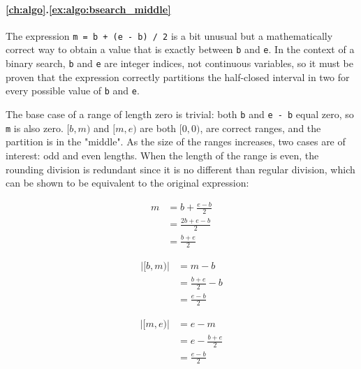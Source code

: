 \paragraph{\ref{ch:algo}.\ref{ex:algo:bsearch_middle}}

The expression \texttt{m = b + (e - b) / 2} is a bit unusual but a
mathematically correct way to obtain a value that is exactly between \texttt{b}
and \texttt{e}.  In the context of a binary search, \texttt{b} and \texttt{e}
are integer indices, not continuous variables, so it must be proven that the
expression correctly partitions the half-closed interval in two for every
possible value of \texttt{b} and \texttt{e}.

The base case of a range of length zero is trivial: both \texttt{b} and
\texttt{e - b} equal zero, so \texttt{m} is also zero\footnotemark.  $[b, m)$
and $[m, e)$ are both $[0, 0)$, are correct ranges, and the partition is in the
"middle".  As the size of the ranges increases, two cases are of interest: odd
and even lengths.  When the length of the range is even, the rounding division
is redundant since it is no different than regular division, which can be shown
to be equivalent to the original expression:

\footnotetext{
    Recall that, as mentioned in section \secref{subsec:algo:ranges}, the length
    calculation for half-open ranges is very simple: $|[b, e)| = e - b$.}

\begin{multicols}{3}
    \begin{align*}
        m &= b + \frac{e - b}{2} \\
          &= \frac{2b + e - b}{2} \\
          &= \frac{b + e}{2} \\
    \end{align*}
    \columnbreak
    \begin{align*} \\
        |[b, m)| &= m - b \phantom{\frac{1}{1}} \\
                 &= \frac{b + e}{2} - b \\
                 &= \frac{e - b}{2} \\
    \end{align*}
    \columnbreak
    \begin{align*} \\
        |[m, e)| &= e - m \phantom{\frac{1}{1}} \\
                 &= e - \frac{b + e}{2} \\
                 &= \frac{e - b}{2} \\
    \end{align*}
\end{multicols}

